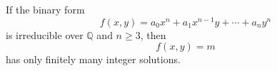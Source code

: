 \begin{proposition}
    If the binary form
\[
    f(x,y)=a_0x^n+a_1x^{n-1}y+\cdots+a_ny^n
\]
    is irreducible over $\mathbb{Q}$ and $n\ge3$, then
\[
    f(x,y)=m
\]
    has only finitely many integer solutions.
\end{proposition}
